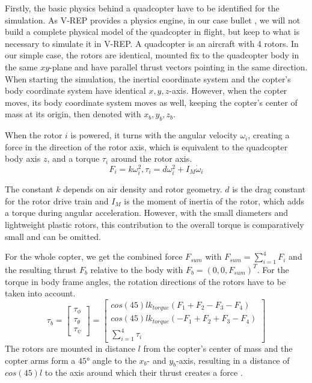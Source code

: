     
    Firstly, the basic physics behind a quadcopter have to be identified for the simulation. 
    As V-REP provides a physics engine, in our case bullet \cite{bullet}, we will not build a complete physical model of the quadcopter in flight, but keep to what is necessary to simulate it in V-REP.
    A quadcopter is an aircraft with 4 rotors. 
    In our simple case, the rotors are identical, mounted fix to the quadcopter body in the same $xy$-plane and have parallel thrust vectors pointing in the same direction. 
    When starting the simulation, the inertial coordinate system and the copter's body coordinate system have identical $x,y,z$-axis. 
    However, when the copter moves, its body coordinate system moves as well, keeping the copter's center of mass at its origin, then denoted with $x_b, y_b, z_b$.
    
    When the rotor $i$ is powered, it turns with the angular velocity $\omega_i$, creating a force in the direction of the rotor axis, which is equivalent to the quadcopter body axis $z$, and a torque $\tau_i$ around the rotor axis.
    \begin{equation}
    F_i = k\omega_i^2, \tau_i = d\omega_i^2 + I_M\dot\omega_i
    \label{equ:forceAndTorque}
    \end{equation}
    
    The constant $k$ depends on air density and rotor geometry. $d$ is the drag constant for the rotor drive train and $I_M$ is the moment of inertia of the rotor, which adds a torque during angular acceleration. However, with the small diameters and lightweight plastic rotors, this contribution to the overall torque is comparatively small and can be omitted.
    
    For the whole copter, we get the combined force $F_{sum}$ with $F_{sum} = \sum_{i=1}^{4}{F_i}$ and the resulting thrust $F_b$ relative to the body with $F_b = (0, 0, F_{sum})^T$. For the torque in body frame angles, the rotation directions of the rotors have to be taken into account.
    \begin{equation}
    \tau_b =\begin{bmatrix}\tau_\phi \\ \tau_\theta \\ \tau_\psi \end{bmatrix} = \begin{bmatrix}cos(45)lk_{torque}(F_1 + F_2 - F_3 - F_4) \\ cos(45)lk_{torque}(-F_1 + F_2 + F_3  - F_4  ) \\ \sum_{i=1}^{4}{\tau_i} \end{bmatrix}
    \label{equ:torques}
    \end{equation}
    The rotors are mounted in distance $l$ from the copter's center of mass and the copter arms form a $\ang{45}$ angle to the $x_b$- and $y_b$-axis, resulting in a distance of $cos(45)l$ to the axis around which their thrust creates a force \cite{luukkonen2011modelling}.
    
